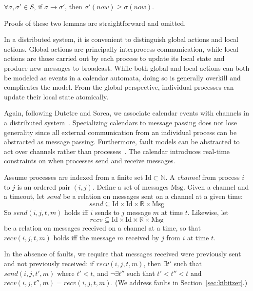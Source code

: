 \documentclass{llncs/llncs}
\newcommand{\Id}{\ensuremath{\mathrm{Id}}\xspace}
\newcommand{\Msg}{\ensuremath{\mathrm{Msg}}\xspace}
\begin{document}
\begin{lemma}
$\forall \sigma, \sigma' \in S$, if $\sigma \rightarrow \sigma'$, then $\sigma'(now) \geq \sigma(now)$.
\end{lemma}

Proofs of these two lemmas are straightforward and omitted.

In a distributed system, it is convenient to distinguish global actions and local actions. Global actions are principally interprocess communication, while local actions are those carried out by each process to update its local state and produce new messages to broadcast. While both global and local actions can both be modeled as events in a calendar automata, doing so is generally overkill and complicates the model. From the global perspective, individual processes can update their local state atomically.

Again, following Dutetre and Sorea, we associate calendar events with channels in a distributed system~\cite{cal}. Specializing calendars to message passing does not lose generality since all external communication from an individual process can be abstracted as message passing. Furthermore, fault models can be abstracted to act over channels rather than processes~\cite{abstractions}. The calendar introduces real-time constraints on when processes send and receive messages.

Assume processes are indexed from a finite set $\Id \subset \mathbb{N}$. A \emph{channel} from process $i$ to $j$ is an ordered pair $(i,j)$. Define a set of messages $\Msg$. Given a channel and a timeout, let $send$ be a relation on messages sent on a channel at a given time:
$$send \subseteq \Id \times \Id \times \mathbb{R} \times \Msg$$
So $send(i, j, t, m)$ holds iff $i$ sends to $j$ message $m$ at time $t$. Likewise, let
$$recv \subseteq \Id \times \Id \times \mathbb{R} \times \Msg$$
be a relation on messages received on a channel at a time, so that $recv(i, j, t, m)$ holds iff the message $m$ received by $j$ from $i$ at time $t$.

In the absence of faults, we require that messages received were previously sent and not previously received: if $recv(i, j, t, m)$, then $\exists t'$ such that $send(i, j, t', m)$ where $t' < t$, and $\neg\exists t''$ such that $t' < t'' < t$ and $recv(i, j, t'', m) = recv(i, j, t, m)$. (We address faults in Section~\ref{sec:kibitzer}.)
\end{document}
